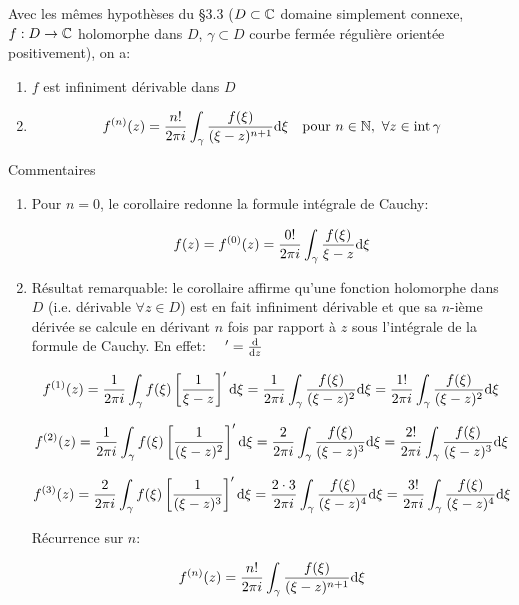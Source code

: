 Avec les mêmes hypothèses du §3.3 ($D \subset \mathbb{C}$ domaine simplement connexe, $f: D \rightarrow \mathbb{C}$ holomorphe dans $D$, $\gamma \subset D$ courbe fermée régulière orientée positivement), on a:

\begin{enumerate}[label=\arabic{enumi})]
    \item 
    $f$ est infiniment dérivable dans $D$
    \item 
    \[
    f^{(n)}(z) = \frac{n!}{2\pi i} \int_\gamma \frac{f(\xi)}{(\xi - z)^{n+1}} \mathrm{d}\xi \quad \textrm{pour } n \in \mathbb{N}, \ \forall z \in \textrm{int}\, \gamma
    \]
\end{enumerate}

Commentaires

\begin{enumerate}[label=\arabic{enumi})]
    \item 
    Pour $n=0$, le corollaire redonne la formule intégrale de Cauchy:
    
    \[
    f(z) = f^{(0)}(z) = \frac{0!}{2\pi i} \int_\gamma \frac{f(\xi)}{\xi - z} \mathrm{d}\xi
    \]
    
    \item 
    Résultat remarquable: le corollaire affirme qu'une fonction holomorphe dans $D$ (i.e. dérivable $\forall z \in D$) est en fait infiniment dérivable et que sa $n$-ième dérivée se calcule en dérivant $n$ fois par rapport à $z$ sous l'intégrale de la formule de Cauchy.
    En effet: $\quad ' = \frac{\mathrm{d}}{\mathrm{d}z}$
    
    \[
    f^{(1)}(z) = \frac{1}{2\pi i} \int_\gamma f(\xi) \left[\frac{1}{\xi - z}\right]' \mathrm{d}\xi
    = \frac{1}{2\pi i} \int_\gamma \frac{f(\xi)}{(\xi - z)^2} \mathrm{d}\xi = \frac{1!}{2\pi i} \int_\gamma \frac{f(\xi)}{(\xi - z)^2} \mathrm{d}\xi
    \]
    
    \[
    f^{(2)}(z) = \frac{1}{2\pi i} \int_\gamma f(\xi) \left[\frac{1}{(\xi - z)^2}\right]' \mathrm{d}\xi
    = \frac{2}{2\pi i} \int_\gamma \frac{f(\xi)}{(\xi - z)^3} \mathrm{d}\xi = \frac{2!}{2\pi i} \int_\gamma \frac{f(\xi)}{(\xi - z)^3} \mathrm{d}\xi 
    \]
    
    \[
    f^{(3)}(z) = \frac{2}{2\pi i} \int_\gamma f(\xi) \left[\frac{1}{(\xi - z)^3}\right]' \mathrm{d}\xi
    = \frac{2 \cdot 3}{2\pi i} \int_\gamma \frac{f(\xi)}{(\xi - z)^4} \mathrm{d}\xi = \frac{3!}{2\pi i} \int_\gamma \frac{f(\xi)}{(\xi - z)^4} \mathrm{d}\xi 
    \]
    
    Récurrence sur $n$:
    
    \[
    f^{(n)}(z) = \frac{n!}{2\pi i} \int_\gamma \frac{f(\xi)}{(\xi - z)^{n+1}} \mathrm{d}\xi
    \]
\end{enumerate}

